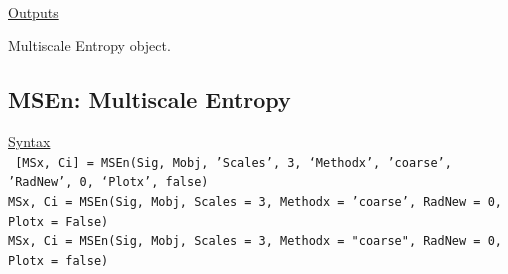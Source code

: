 \documentclass[12pt, a4paper, titlepage, openany]{book}
\begin{document}
\ \\ \noindent \ul{Outputs}
\begin{description}[labelsep=1cm, labelwidth=2cm, nosep, style=multiline,leftmargin=4cm]\footnotesize
\item[\texttt{Mobj}]		Multiscale Entropy object.
\end{description}



\newpage
\subsection{\normalsize MSEn: \hspace{15mm} Multiscale Entropy} \label{MSEn}
\noindent\ul{Syntax} \vspace{6mm} \\ \noindent \texttt{\footnotesize
[MSx, Ci] = MSEn(Sig, Mobj, 'Scales', 3, ‘Methodx’, 'coarse', 'RadNew', 0, ‘Plotx’, false)\\
MSx, Ci = MSEn(Sig, Mobj, Scales = 3, Methodx = 'coarse', RadNew = 0, Plotx = False)\\ 
MSx, Ci = MSEn(Sig, Mobj, Scales = 3, Methodx = "coarse", RadNew = 0, Plotx = false)}
\end{document}
